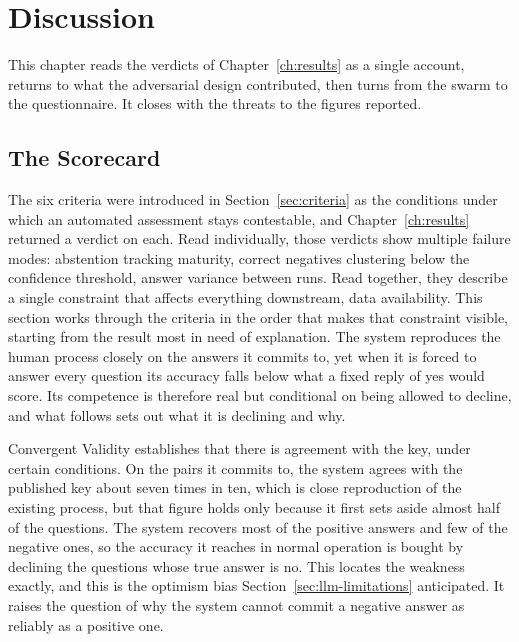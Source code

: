 \chapter{Discussion}\label{ch:discussion}

This chapter reads the verdicts of Chapter~\ref{ch:results} as a single account, returns to what the adversarial design contributed, then turns from the swarm to the questionnaire. It closes with the threats to the figures reported.

\section{The Scorecard}\label{sec:scorecard}

The six criteria were introduced in Section~\ref{sec:criteria} as the conditions under which an automated assessment stays contestable, and Chapter~\ref{ch:results} returned a verdict on each. Read individually, those verdicts show multiple failure modes: abstention tracking maturity, correct negatives clustering below the confidence threshold, answer variance between runs. Read together, they describe a single constraint that affects everything downstream, data availability. This section works through the criteria in the order that makes that constraint visible, starting from the result most in need of explanation. The system reproduces the human process closely on the answers it commits to, yet when it is forced to answer every question its accuracy falls below what a fixed reply of yes would score. Its competence is therefore real but conditional on being allowed to decline, and what follows sets out what it is declining and why.

Convergent Validity establishes that there is agreement with the key, under certain conditions. On the pairs it commits to, the system agrees with the published key about seven times in ten, which is close reproduction of the existing process, but that figure holds only because it first sets aside almost half of the questions. The system recovers most of the positive answers and few of the negative ones, so the accuracy it reaches in normal operation is bought by declining the questions whose true answer is no. This locates the weakness exactly, and this is the optimism bias Section~\ref{sec:llm-limitations} anticipated. It raises the question of why the system cannot commit a negative answer as reliably as a positive one.

